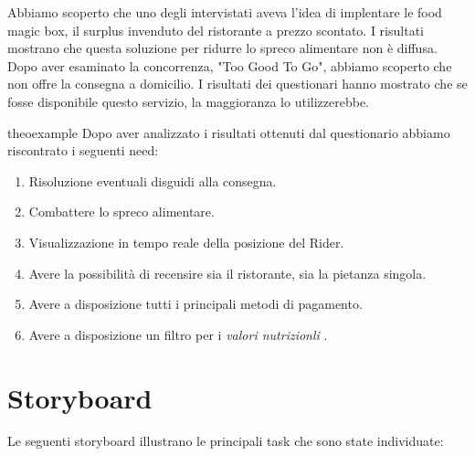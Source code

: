 \documentclass{article}
\begin{document}
Abbiamo scoperto che uno degli intervistati aveva l'idea di implentare le food magic box, il surplus invenduto del ristorante a prezzo scontato. I risultati mostrano che questa soluzione per ridurre lo spreco alimentare non è diffusa. Dopo aver esaminato la concorrenza, "Too Good To Go", abbiamo scoperto che non offre la consegna a domicilio. I risultati dei questionari hanno mostrato che se fosse disponibile questo servizio, la maggioranza lo utilizzerebbe.
\vspace{1.5cm}
\begin{need}{}{theoexample}
    Dopo aver analizzato i risultati ottenuti dal questionario abbiamo riscontrato i seguenti need:
    \begin{enumerate}
        \item Risoluzione eventuali disguidi alla consegna.
        \item Combattere lo spreco alimentare.
        \item Visualizzazione in tempo reale della posizione del Rider.
        \item Avere la possibilità di recensire sia il ristorante, sia la pietanza singola.
        \item Avere a disposizione tutti i principali metodi di pagamento.
        \item Avere a disposizione un filtro per i \textit{valori nutrizionli} .
    \end{enumerate}
    \end{need}

    \vspace{1cm}
\vspace{4cm}
\pagebreak
\section{Storyboard} \par
Le seguenti storyboard illustrano le principali task che sono state individuate:
\end{document}
